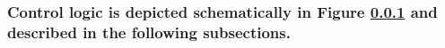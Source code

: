 \documentclass[10pt]{article}
\begin{document}
\subsubsection{Control logic is depicted schematically in Figure \ref{figure:control_logic} and described in the following subsections.} \label{figure:control_logic}


%  

\ifdefined\BuildingsTemplatesAirHandlersFansInterfacesPartialAirHandlertypFanRet
\fi
\end{document}
